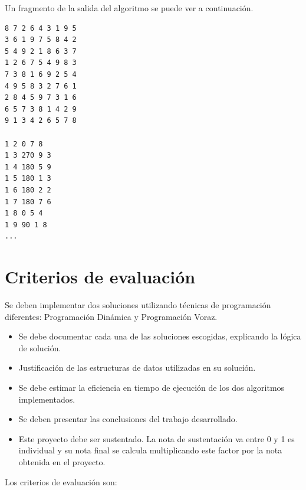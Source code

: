 \documentclass[twocolumn]{article}
\begin{document}
Un fragmento de la salida del algoritmo se puede ver a continuación.

\begin{lstlisting}
8 7 2 6 4 3 1 9 5
3 6 1 9 7 5 8 4 2
5 4 9 2 1 8 6 3 7
1 2 6 7 5 4 9 8 3
7 3 8 1 6 9 2 5 4
4 9 5 8 3 2 7 6 1
2 8 4 5 9 7 3 1 6
6 5 7 3 8 1 4 2 9
9 1 3 4 2 6 5 7 8

1 2 0 7 8
1 3 270 9 3
1 4 180 5 9
1 5 180 1 3
1 6 180 2 2
1 7 180 7 6
1 8 0 5 4
1 9 90 1 8
...
\end{lstlisting}

\section{Criterios de evaluación}

Se deben implementar dos soluciones utilizando técnicas de programación diferentes:
Programación Dinámica y Programación Voraz.

\begin{itemize}
	\item Se debe documentar cada una de las soluciones escogidas, explicando la lógica de solución.
	\item Justificación de las estructuras de datos utilizadas en su solución.
	\item Se debe estimar la eficiencia en tiempo de ejecución de los dos algoritmos implementados.
	\item Se deben presentar las conclusiones del trabajo desarrollado.
	\item Este proyecto debe ser sustentado. La nota de sustentación va entre 0 y 1 es individual y su nota final se calcula multiplicando este factor por la nota obtenida en el proyecto.
\end{itemize}

Los criterios de evaluación son:
\end{document}
